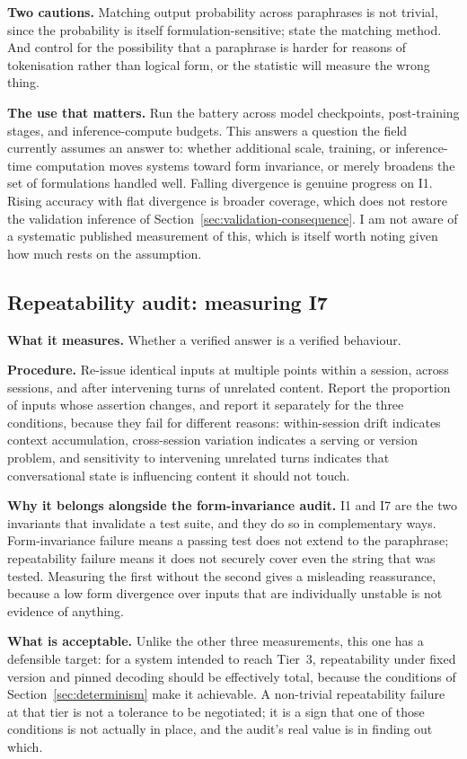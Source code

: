 \documentclass[11pt]{article}
\theoremstyle{plain}
\theoremstyle{definition}
\begin{document}
\textbf{Two cautions.} Matching output probability across paraphrases is not
trivial, since the probability is itself formulation-sensitive; state the matching
method. And control for the possibility that a paraphrase is harder for reasons of
tokenisation rather than logical form, or the statistic will measure the wrong
thing.

\textbf{The use that matters.} Run the battery across model checkpoints,
post-training stages, and inference-compute budgets. This answers a question the
field currently assumes an answer to: whether additional scale, training, or
inference-time computation moves systems toward form invariance, or merely broadens
the
set of formulations handled well. Falling divergence is genuine progress on I1.
Rising accuracy with flat divergence is broader coverage, which does not restore
the validation inference of
Section~\ref{sec:validation-consequence}. I am not aware of a systematic published
measurement of this, which is itself worth noting given how much rests on the
assumption.

\subsection{Repeatability audit: measuring I7}

\textbf{What it measures.} Whether a verified answer is a verified behaviour.

\textbf{Procedure.} Re-issue identical inputs at multiple points within a session,
across sessions, and after intervening turns of unrelated content. Report the proportion
of inputs whose assertion changes, and report it separately for the three conditions,
because they fail for different reasons: within-session drift indicates context
accumulation, cross-session variation indicates a serving or version problem, and
sensitivity to intervening unrelated turns indicates that conversational state is
influencing content it should not touch.

\textbf{Why it belongs alongside the form-invariance audit.} I1 and I7 are the two
invariants that invalidate a test suite, and they do so in complementary ways.
Form-invariance failure means a passing test does not extend to the paraphrase;
repeatability failure means it does not securely cover even the string that was tested.
Measuring the first without the second gives a misleading reassurance, because a low form
divergence over inputs that are individually unstable is not evidence of anything.

\textbf{What is acceptable.} Unlike the other three measurements, this one has a defensible
target: for a system intended to reach Tier~3, repeatability under fixed version and
pinned decoding should be effectively total, because the conditions of
Section~\ref{sec:determinism} make it achievable. A non-trivial repeatability failure at
that tier is not a tolerance to be negotiated; it is a sign that one of those conditions is
not actually in place, and the audit's real value is in finding out which.
\end{document}
